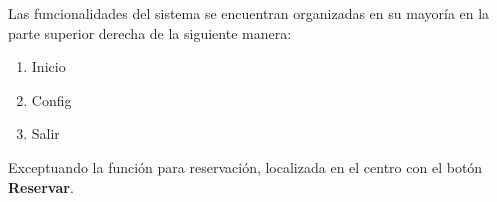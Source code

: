 Las funcionalidades del sistema se encuentran organizadas 
en su mayoría en la parte superior derecha de la siguiente manera:

\begin{enumerate}
	\item Inicio
	\item Config
	\item Salir
\end{enumerate}

Exceptuando la función para reservación, localizada en el centro
con el botón \textbf{Reservar}.
